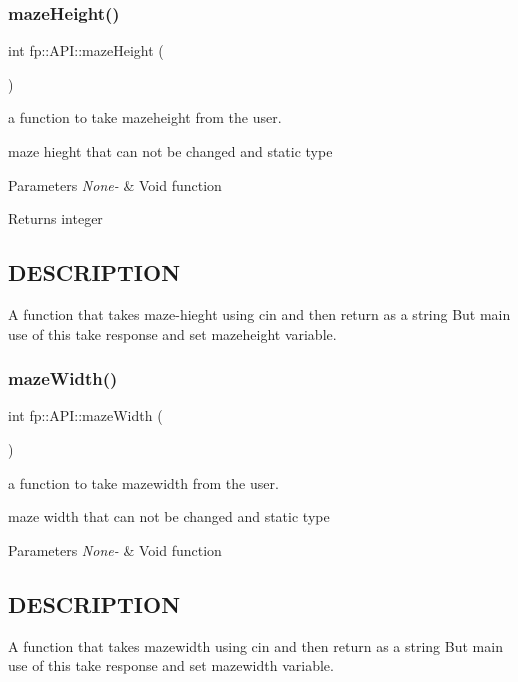 \subsubsection{\texorpdfstring{maze\+Height()}{mazeHeight()}}
{\footnotesize\ttfamily int fp\+::\+A\+P\+I\+::maze\+Height (\begin{DoxyParamCaption}{ }\end{DoxyParamCaption})\hspace{0.3cm}{\ttfamily [static]}}



a function to take mazeheight from the user. 

maze hieght that can not be changed and static type


\begin{DoxyParams}{Parameters}
{\em None-\/} & Void function \\
\hline
\end{DoxyParams}
\begin{DoxyReturn}{Returns}
integer 
\end{DoxyReturn}
\hypertarget{_m_a_z_e_8h_DESCRIPTION}{}\subsection{D\+E\+S\+C\+R\+I\+P\+T\+I\+ON}\label{_m_a_z_e_8h_DESCRIPTION}
A function that takes maze-\/hieght using cin and then return as a string But main use of this take response and set mazeheight variable. \mbox{\label{classfp_1_1_a_p_i_af8adb8d6fe6b921de4172111b32fc710}} 
\subsubsection{\texorpdfstring{maze\+Width()}{mazeWidth()}}
{\footnotesize\ttfamily int fp\+::\+A\+P\+I\+::maze\+Width (\begin{DoxyParamCaption}{ }\end{DoxyParamCaption})\hspace{0.3cm}{\ttfamily [static]}}



a function to take mazewidth from the user. 

maze width that can not be changed and static type


\begin{DoxyParams}{Parameters}
{\em None-\/} & Void function \\
\hline
\end{DoxyParams}
\hypertarget{_m_a_z_e_8h_DESCRIPTION}{}\subsection{D\+E\+S\+C\+R\+I\+P\+T\+I\+ON}\label{_m_a_z_e_8h_DESCRIPTION}
A function that takes mazewidth using cin and then return as a string But main use of this take response and set mazewidth variable. \mbox{\label{classfp_1_1_a_p_i_a4863c0dec23d677c5eefb7c03088b29c}} 
